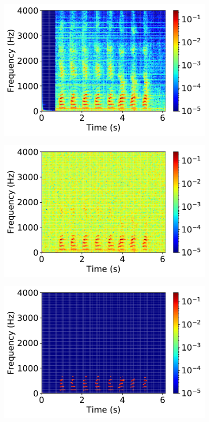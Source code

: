 \documentclass[12pt,twoside]{article}
\begin{document}
\begin{enumerate}
	\begin{figure}[H]
		\centering
		\captionsetup{justification=centering}
        		\includegraphics[width=300pt]{code/STFT/plots/stft_denoising__clean_0_stft}
	\end{figure}
	\begin{figure}[H]
		\centering
		\captionsetup{justification=centering}
        		\includegraphics[width=300pt]{code/STFT/plots/stft_denoising__noisy_0_stft}
	\end{figure}
	\begin{figure}[H]
		\centering
		\captionsetup{justification=centering}
        		\includegraphics[width=300pt]{code/STFT/plots/stft_denoising__denoised_0_stft}

\end{figure}
\end{enumerate}
\end{document}
